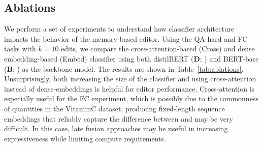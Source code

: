 \subsection{Ablations}
We perform a set of experiments to understand how classifier architecture impacts the behavior of the memory-based editor. Using the QA-hard and FC tasks with $k=10$ edits, we compare the cross-attention-based (Cross) and dense embedding-based (Embed) classifier using both distilBERT (\textbf{D}; \citep{Sanh2019DistilBERTAD}) and BERT-base (\textbf{B}; \citep{devlin2019bert}) as the backbone model. The results are shown in Table~\ref{tab:ablations}. Unsurprisingly, both increasing the size of the classifier and using cross-attention instead of dense-embeddings is helpful for editor performance. Cross-attention is especially useful for the FC experiment, which is possibly due to the commonness of quantities in the VitaminC dataset; producing fixed-length sequence embeddings that reliably capture the difference between  and  may be very difficult. In this case, late fusion approaches \citep{khattab2020colbert} may be useful in increasing expressiveness while limiting compute requirements.